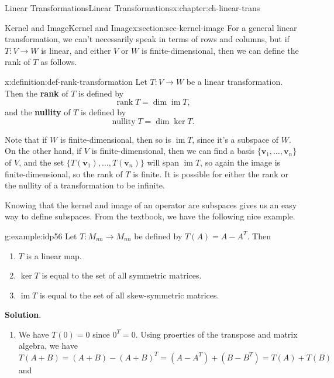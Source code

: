 \documentclass[oneside,10pt,]{book}
\newcommand{\blocktitlefont}{\relax}
\newcommand{\terminology}[1]{\textbf{#1}}
\numberwithin{equation}{section}
\newcommand{\im}{\operatorname{im}}
\newcommand{\vv}{\mathbf{v}}
\begin{document}
\begin{chapterptx}{Linear Transformations}{}{Linear Transformations}{}{}{x:chapter:ch-linear-trans}
\begin{sectionptx}{Kernel and Image}{}{Kernel and Image}{}{}{x:section:sec-kernel-image}
For a general linear transformation, we can't necessarily speak in terms of rows and columns, but if \(T:V\to W\) is linear, and either \(V\) or \(W\) is finite-dimensional, then we can define the rank of \(T\) as follows.%
\begin{definition}{}{x:definition:def-rank-transformation}%
Let \(T:V\to W\) be a linear transformation. Then the \terminology{rank} of \(T\) is defined by%
\begin{equation*}
\operatorname{rank} T = \dim \im T\text{,}
\end{equation*}
and the \terminology{nullity} of \(T\) is defined by%
\begin{equation*}
\operatorname{nullity} T = \dim \ker T\text{.}
\end{equation*}
%
\end{definition}
Note that if \(W\) is finite-dimensional, then so is \(\im T\), since it's a subspace of \(W\). On the other hand, if \(V\) is finite-dimensional, then we can find a basis \(\{\vv_1,\ldots, \vv_n\}\) of \(V\), and the set \(\{T(\vv_1),\ldots, T(\vv_n)\}\) will span \(\im T\), so again the image is finite-dimensional, so the rank of \(T\) is finite. It is possible for either the rank or the nullity of a transformation to be infinite.%
\par
Knowing that the kernel and image of an operator are subspaces gives us an easy way to define subspaces. From the textbook, we have the following nice example.%
\begin{example}{}{g:example:idp56}%
Let \(T:M_{nn}\to M_{nn}\) be defined by \(T(A)=A-A^T\). Then%
\begin{enumerate}
\item{}\(T\) is a linear map.%
\item{}\(\ker T\) is equal to the set of all symmetric matrices.%
\item{}\(\im T\) is equal to the set of all skew-symmetric matrices.%
\end{enumerate}
%
\par\smallskip%
\noindent\textbf{\blocktitlefont Solution}.\hypertarget{g:solution:idp57}{}\quad{}%
\begin{enumerate}
\item{}We have \(T(0)=0\) since \(0^T=0\). Using proerties of the transpose and matrix algebra, we have%
\begin{equation*}
T(A+B) = (A+B)-(A+B)^T = (A-A^T)+(B-B^T) = T(A)+T(B)
\end{equation*}
and%
\begin{equation*}

\end{equation*}
\end{enumerate}
\end{example}
\end{sectionptx}
\end{chapterptx}
\end{document}
